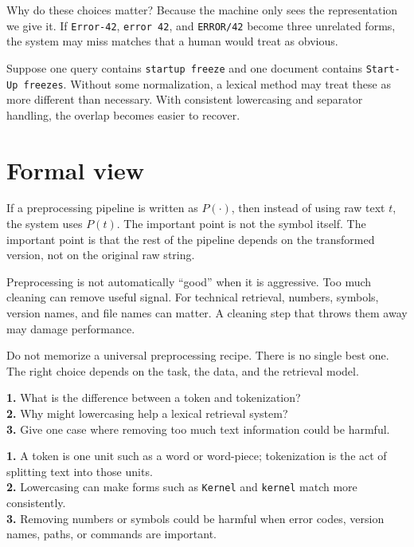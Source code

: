 \documentclass[11pt,oneside]{report}
\newcommand{\code}[1]{\texttt{#1}}
\begin{document}
Why do these choices matter? Because the machine only sees the representation we give it. If \code{Error-42}, \code{error 42}, and \code{ERROR/42} become three unrelated forms, the system may miss matches that a human would treat as obvious.

\begin{examplebox}
Suppose one query contains \code{startup freeze} and one document contains \code{Start-Up freezes}. Without some normalization, a lexical method may treat these as more different than necessary. With consistent lowercasing and separator handling, the overlap becomes easier to recover.
\end{examplebox}

\section*{Formal view}
If a preprocessing pipeline is written as $P(\cdot)$, then instead of using raw text $t$, the system uses $P(t)$. The important point is not the symbol itself. The important point is that the rest of the pipeline depends on the transformed version, not on the original raw string.

\begin{warningbox}
Preprocessing is not automatically ``good'' when it is aggressive. Too much cleaning can remove useful signal. For technical retrieval, numbers, symbols, version names, and file names can matter. A cleaning step that throws them away may damage performance.
\end{warningbox}

\begin{notebox}
Do not memorize a universal preprocessing recipe. There is no single best one. The right choice depends on the task, the data, and the retrieval model.
\end{notebox}

\begin{selfcheckbox}
\textbf{1.} What is the difference between a token and tokenization?\\
\textbf{2.} Why might lowercasing help a lexical retrieval system?\\
\textbf{3.} Give one case where removing too much text information could be harmful.
\end{selfcheckbox}

\begin{answerbox}
\textbf{1.} A token is one unit such as a word or word-piece; tokenization is the act of splitting text into those units.\\
\textbf{2.} Lowercasing can make forms such as \code{Kernel} and \code{kernel} match more consistently.\\
\textbf{3.} Removing numbers or symbols could be harmful when error codes, version names, paths, or commands are important.
\end{answerbox}
\end{document}

